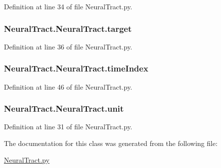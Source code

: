 Definition at line 34 of file Neural\-Tract.\-py.

\hypertarget{class_neural_tract_1_1_neural_tract_a637995fcac5bdd80ab1a9d4ea3de7f40}{
\subsubsection[{target}]{\setlength{\rightskip}{0pt plus 5cm}Neural\-Tract.\-Neural\-Tract.\-target}}\label{class_neural_tract_1_1_neural_tract_a637995fcac5bdd80ab1a9d4ea3de7f40}


Definition at line 36 of file Neural\-Tract.\-py.

\hypertarget{class_neural_tract_1_1_neural_tract_adcda2b95aa86d4e7eebcc2557aee58cf}{
\subsubsection[{time\-Index}]{\setlength{\rightskip}{0pt plus 5cm}Neural\-Tract.\-Neural\-Tract.\-time\-Index}}\label{class_neural_tract_1_1_neural_tract_adcda2b95aa86d4e7eebcc2557aee58cf}


Definition at line 46 of file Neural\-Tract.\-py.

\hypertarget{class_neural_tract_1_1_neural_tract_a95db7d0720ec12f091758968476ba240}{
\subsubsection[{unit}]{\setlength{\rightskip}{0pt plus 5cm}Neural\-Tract.\-Neural\-Tract.\-unit}}\label{class_neural_tract_1_1_neural_tract_a95db7d0720ec12f091758968476ba240}


Definition at line 31 of file Neural\-Tract.\-py.



The documentation for this class was generated from the following file\-:\begin{DoxyCompactItemize}
\item 
\hyperlink{_neural_tract_8py}{Neural\-Tract.\-py}\end{DoxyCompactItemize}
